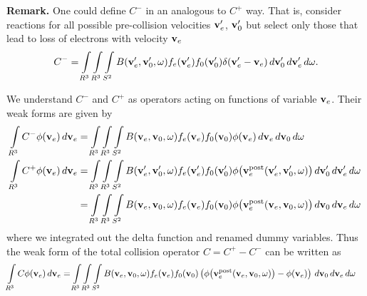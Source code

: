\documentclass{article}[draft]
\begin{document}
\textbf{Remark.} One could define $C^-$ in an analogous to $C^+$ way. That is, consider reactions for all possible pre-collision velocities $\mathbf{v}_e^\prime$, $\mathbf{v}_0^\prime$ but select only those that lead to loss of electrons with velocity $\mathbf{v}_e$
\begin{align*}
C^- = \myint_{R^3} \myint_{R^3} \myint_{S^2} 
B\of{\vect{v}_e^\prime, \vect{v}_0^\prime, \vect{\omega}} 
f_e\of{\vect{v}_e^\prime} f_0\of{\vect{v}_0^\prime} 
\delta\of{\vect{v}_e^\prime - \vect{v}_e} 
\diff{\vect{v}_0^\prime} \diff{\vect{v}_e^\prime} \diff{\vect{\omega}}.
\end{align*}

We understand $C^-$ and $C^+$ as operators acting on functions of variable $\mathbf{v}_e$. Their weak forms are given by
\begin{align*}
\myint_{R^3} C^- \phi\of{\vect{v}_e} \diff{\vect{v}_e} 
&=
\myint_{R^3} \myint_{R^3} \myint_{S^2} 
B\of{\vect{v}_e, \vect{v}_0, \vect{\omega}} 
f_e\of{\vect{v}_e} f_0\of{\vect{v}_0} 
\phi\of{\vect{v}_e} 
\diff{\vect{v}_e} \diff{\vect{v}_0} \diff{\vect{\omega}}
\\
\myint_{R^3} C^+ \phi\of{\vect{v}_e} \diff{\vect{v}_e} 
&= 
\myint_{R^3} \myint_{R^3} \myint_{S^2} 
B\of{\vect{v}_e^\prime, \vect{v}_0^\prime, \vect{\omega}} 
f_e\of{\vect{v}_e^\prime} f_0\of{\vect{v}_0^\prime} 
\phi\of{\vect{v}_e^\text{post}\of{\vect{v}_e^\prime, \vect{v}_0^\prime, \vect{\omega}}} 
\diff{\vect{v}_0^\prime} \diff{\vect{v}_e^\prime} \diff{\vect{\omega}}
\\
&= 
\myint_{R^3} \myint_{R^3} \myint_{S^2} 
B\of{\vect{v}_e, \vect{v}_0, \vect{\omega}} 
f_e\of{\vect{v}_e} f_0\of{\vect{v}_0} 
\phi\of{\vect{v}_e^\text{post}\of{\vect{v}_e, \vect{v}_0, \vect{\omega}}} 
\diff{\vect{v}_0} \diff{\vect{v}_e} \diff{\vect{\omega}}
\end{align*}
where we integrated out the delta function and renamed dummy variables. Thus the weak form of the total collision operator $C = C^+ - C^-$ can be written as 
\begin{align*}
\myint_{R^3} C \phi\of{\vect{v}_e} \diff{\vect{v}_e} 
&=
\myint_{R^3} \myint_{R^3} \myint_{S^2} 
B\of{\vect{v}_e, \vect{v}_0, \vect{\omega}} 
f_e\of{\vect{v}_e} f_0\of{\vect{v}_0} 
\left(
\phi\of{\vect{v}_e^\text{post}\of{\vect{v}_e, \vect{v}_0, \vect{\omega}}} 
- \phi\of{\vect{v}_e} 
\right)
\diff{\vect{v}_0} \diff{\vect{v}_e} \diff{\vect{\omega}}
\end{align*}
\end{document}
